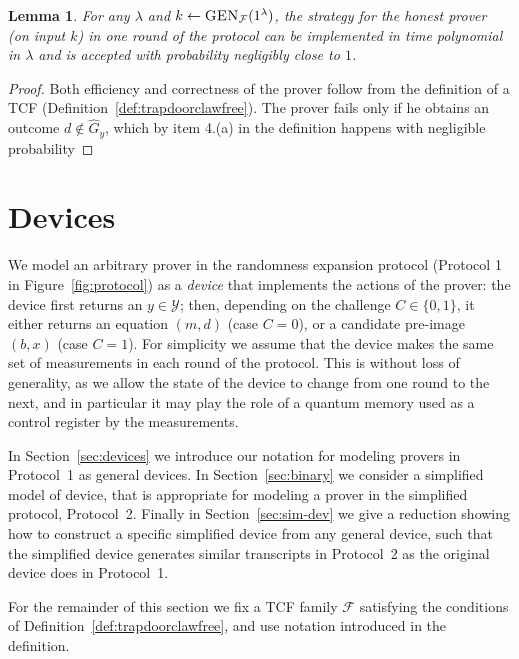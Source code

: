 \documentclass[11pt]{article}
\newtheorem{lemma}[theorem]{Lemma}
\theoremstyle{remark}
\theoremstyle{definition}
\newcommand{\mY}{\ensuremath{\mathcal{Y}}}
\newcommand{\GEN}{\ensuremath{\textsc{GEN}}}
\newcommand{\dset}{G}
\begin{document}
\begin{lemma}\label{lem:completeness}
For any $\lambda$ and $k\leftarrow\GEN_{\mathcal{F}}(1^\lambda)$, the strategy for the honest prover (on input $k$) in one round of the protocol can be implemented in time polynomial in $\lambda$ and is accepted with probability negligibly close to $1$.  
\end{lemma}

\begin{proof}
Both efficiency and correctness of the prover follow from the definition of a TCF (Definition~\ref{def:trapdoorclawfree}). The prover fails only if he obtains an outcome $d\notin \hat{\dset}_y$, which by item 4.(a) in the definition happens with negligible probability
\end{proof}


\section{Devices}

We model an arbitrary prover in the randomness expansion protocol (Protocol 1 in Figure~\ref{fig:protocol}) as a \emph{device} that implements the actions of the prover: the device first returns an $y\in\mY$; then, depending on the challenge $C\in\{0,1\}$, it either returns an equation $(m,d)$ (case $C=0$), or a candidate pre-image $(b,x)$ (case $C=1$). For simplicity we assume that the device makes the same set of measurements in each round of the protocol. This is without loss of generality, as we allow the state of the device to change from one round to the next, and in particular it may play the role of a quantum memory used as a control register by the measurements. 

In Section~\ref{sec:devices} we introduce our notation for modeling provers in Protocol~1 as general devices. In Section~\ref{sec:binary} we consider a simplified model of device, that is appropriate for modeling a prover in the simplified protocol, Protocol~2. Finally in Section~\ref{sec:sim-dev} we give a reduction showing how to construct a specific simplified device from any general device, such that the simplified device generates similar transcripts in Protocol~2 as the original device does in Protocol~1. 

For the remainder of this section we fix a TCF family $\mathcal{F}$ satisfying the conditions of Definition~\ref{def:trapdoorclawfree}, and use notation introduced in the definition. 
\end{document}
